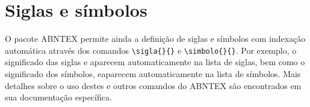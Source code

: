 \section{Siglas e símbolos}
\label{sec:siglas}

O pacote ABNTEX permite ainda a definição de siglas e símbolos com indexação automática através dos comandos \verb#\sigla{}{}# e \verb#\simbolo{}{}#. Por exemplo, o significado das siglas  e  aparecem automaticamente na lista de siglas, bem como o significado dos símbolos, eaparecem automaticamente na lista de símbolos. Mais detalhes sobre o uso destes e outros comandos do ABNTEX são encontrados em sua documentação específica\cite{abnTeX2009}.

%
%
